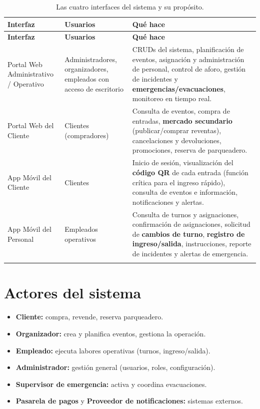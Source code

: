 \begin{longtable}{p{3.3cm}p{3.2cm}p{7.5cm}}
\toprule
\textbf{Interfaz} & \textbf{Usuarios} & \textbf{Qué hace}\\
\midrule
\endfirsthead
\toprule
\textbf{Interfaz} & \textbf{Usuarios} & \textbf{Qué hace}\\
\midrule
\endhead
Portal Web Administrativo / Operativo &
Administradores, organizadores, empleados con acceso de escritorio &
CRUDs del sistema, planificación de eventos, asignación y administración de personal, control de
aforo, gestión de incidentes y \textbf{emergencias/evacuaciones}, monitoreo en tiempo real.\\[0.4em]
Portal Web del Cliente &
Clientes (compradores) &
Consulta de eventos, compra de entradas, \textbf{mercado secundario} (publicar/comprar
reventas), cancelaciones y devoluciones, promociones, reserva de parqueadero.\\[0.4em]
App Móvil del Cliente &
Clientes &
Inicio de sesión, visualización del \textbf{código QR} de cada entrada (función crítica para el
ingreso rápido), consulta de eventos e información, notificaciones y alertas.\\[0.4em]
App Móvil del Personal &
Empleados operativos &
Consulta de turnos y asignaciones, confirmación de asignaciones, solicitud de \textbf{cambios de
turno}, \textbf{registro de ingreso/salida}, instrucciones, reporte de incidentes y alertas de
emergencia.\\
\bottomrule
\caption{Las cuatro interfaces del sistema y su propósito.}
\end{longtable}

\section{Actores del sistema}

\begin{itemize}
\item \textbf{Cliente:} compra, revende, reserva parqueadero.
\item \textbf{Organizador:} crea y planifica eventos, gestiona la operación.
\item \textbf{Empleado:} ejecuta labores operativas (turnos, ingreso/salida).
\item \textbf{Administrador:} gestión general (usuarios, roles, configuración).
\item \textbf{Supervisor de emergencia:} activa y coordina evacuaciones.
\item \textbf{Pasarela de pagos} y \textbf{Proveedor de notificaciones:} sistemas externos.
\end{itemize}

